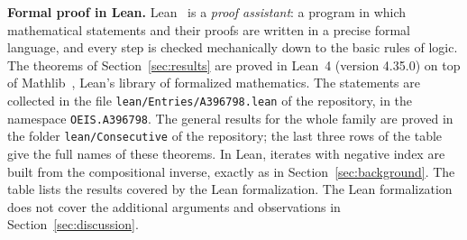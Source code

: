 \documentclass[11pt,a4paper]{article}
\theoremstyle{definition}
\theoremstyle{remark}
\newcommand{\para}[1]{\par\medskip\noindent\textbf{#1}\enspace}
\begin{document}
\para{Formal proof in Lean.}
Lean~\cite{lean} is a \emph{proof assistant}: a program in which mathematical statements and their proofs are written
in a precise formal language, and every step is checked mechanically down to the basic rules of logic. The theorems of Section~\ref{sec:results} are proved in Lean~4 (version 4.35.0) on top of
Mathlib~\cite{mathlib}, Lean's library of formalized mathematics. The statements are collected in the file \texttt{lean/Entries/A396798.lean} of the repository,
in the namespace \texttt{OEIS.A396798}. The general results for the whole family are proved in the folder \texttt{lean/Consecutive} of the
repository; the last three rows of the table give the full names of these theorems. In Lean, iterates with negative index are built from the
compositional inverse, exactly as in Section~\ref{sec:background}.
The table lists the results covered by the Lean formalization. The Lean formalization does not cover the additional arguments and observations in Section~\ref{sec:discussion}.
\end{document}
